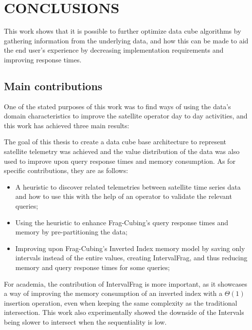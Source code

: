 
\chapter{CONCLUSIONS}\label{ch:concl}

This work shows that it is possible to further optimize data cube algorithms by gathering information from the underlying data, and how this can be made to aid the end user's experience by decreasing implementation requirements and improving response times.

\section{Main contributions}\label{ch:concl:contrib}

One of the stated purposes of this work was to find ways of using the data's domain characteristics to improve the satellite operator day to day activities, and this work has achieved three main results:

The goal of this thesis to create a data cube base architecture to represent satellite telemetry was achieved and the value distribution of the data was also used to improve upon query response times and memory consumption.
As for specific contributions, they are as follows:

\begin{itemize}[noitemsep]
\item A heuristic to discover related telemetries between satellite time series data and how to use this with the help of an operator to validate the relevant queries;
\item Using the heuristic to enhance Frag-Cubing's query response times and memory by pre-partitioning the data;
\item Improving upon Frag-Cubing's Inverted Index memory model by saving only intervals instead of the entire values, creating IntervalFrag, and thus reducing memory and query response times for some queries;
\end{itemize}

For academia, the contribution of IntervalFrag is more important, as it showcases a way of improving the memory consumption of an inverted index with a $\Theta(1)$ insertion operation, even when keeping the same complexity as the traditional intersection.
This work also experimentally showed the downside of the Intervals being slower to intersect when the sequentiality is low.

